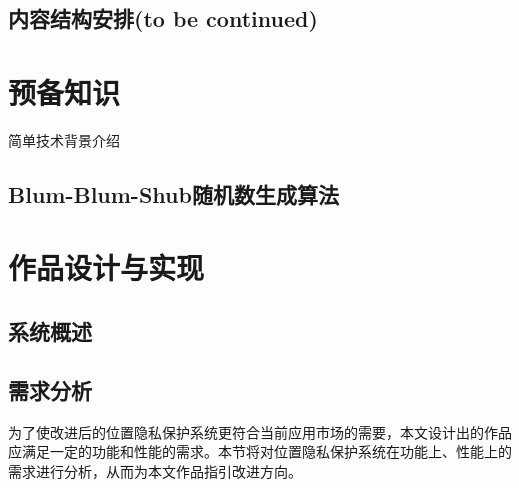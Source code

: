 \documentclass[zihao=-4]{ctexart}
\begin{document}
\subsection{内容结构安排(to be continued)}

\section{预备知识}
简单技术背景介绍
\subsection*{Blum-Blum-Shub随机数生成算法}


\section{作品设计与实现}
\subsection{系统概述}

\subsection{需求分析}
为了使改进后的位置隐私保护系统更符合当前应用市场的需要，本文设计出的作品应满足一定的功能和性能的需求。本节将对位置隐私保护系统在功能上、性能上的需求进行分析，从而为本文作品指引改进方向。
\end{document}
